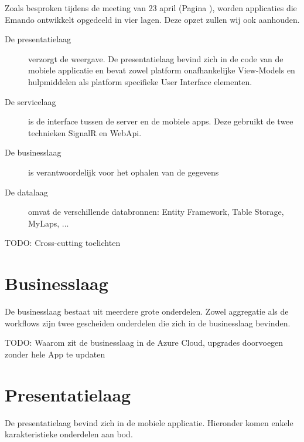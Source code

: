 Zoals besproken tijdens de meeting van 23 april (Pagina \pageref{sec:meeting-23-apr}), worden applicaties die Emando ontwikkelt opgedeeld in vier lagen. Deze opzet zullen wij ook aanhouden.

\begin{description}
\item[De presentatielaag] verzorgt de weergave. De presentatielaag bevind zich in de code van de mobiele applicatie en bevat zowel platform onafhankelijke View-Models en hulpmiddelen als platform specifieke User Interface elementen.
\item[De servicelaag] is de interface tussen de server en de mobiele apps. Deze gebruikt de twee technieken SignalR en WebApi.
\item[De businesslaag] is verantwoordelijk voor het ophalen van de gegevens
\item[De datalaag] omvat de verschillende databronnen: Entity Framework, Table Storage, MyLaps, ...
\end{description}

{\par \bigskip \par \color{red} TODO: Cross-cutting toelichten \par \bigskip \par }

  

\section{Businesslaag}
  De businesslaag bestaat uit meerdere grote onderdelen. Zowel aggregatie als de workflows zijn twee gescheiden onderdelen die zich in de businesslaag bevinden.
  
  {\par \bigskip \par \color{red} TODO: Waarom zit de businesslaag in de Azure Cloud, upgrades doorvoegen zonder hele App te updaten \par \bigskip \par }
  
  
  



\section{Presentatielaag}
  De presentatielaag bevind zich in de mobiele applicatie. Hieronder komen enkele karakteristieke onderdelen aan bod.
  

